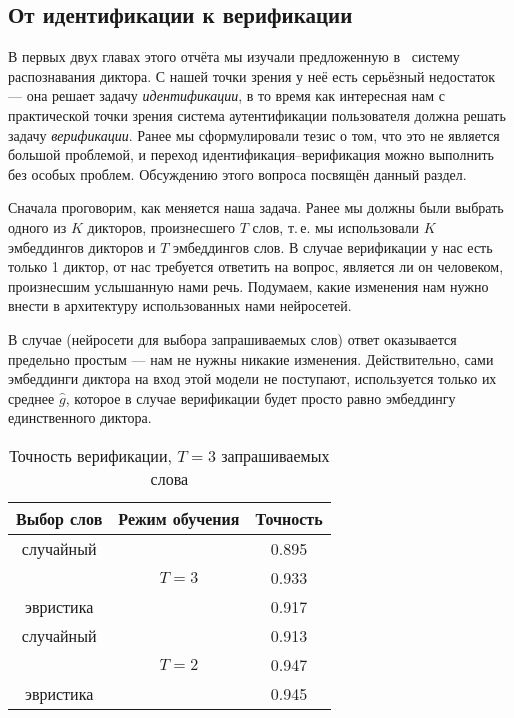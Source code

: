 \subsection{От идентификации к верификации}\label{ssec:verification}

В первых двух главах этого отчёта мы изучали предложенную в~\citeisr{} систему
распознавания диктора. С нашей точки зрения у неё есть серьёзный недостаток ---
она решает задачу \emph{идентификации}, в то время как интересная нам с
практической точки зрения система аутентификации пользователя должна решать
задачу \emph{верификации}. Ранее мы сформулировали тезис о том, что это не
является большой проблемой, и переход идентификация--верификация можно выполнить
без особых проблем. Обсуждению этого вопроса посвящён данный раздел.

Сначала проговорим, как меняется наша задача. Ранее мы должны были выбрать
одного из $K$ дикторов, произнесшего $T$ слов, т.\,е. мы использовали $K$
эмбеддингов дикторов и $T$ эмбеддингов слов. В случае верификации у нас есть
только 1 диктор, от нас требуется ответить на вопрос, является ли он человеком,
произнесшим услышанную нами речь. Подумаем, какие изменения нам нужно внести
в архитектуру использованных нами нейросетей.

В случае \enquirer{} (нейросети для выбора запрашиваемых слов) ответ оказывается
предельно простым --- нам не нужны никакие изменения. Действительно, сами
эмбеддинги диктора на вход этой модели не поступают, используется только их
среднее $\hat{g}$, которое в случае верификации будет просто равно эмбеддингу
единственного диктора.

\begin{table}[htb]
    \centering
    \begin{tabular}{c c c}
        \toprule
        Выбор слов & Режим обучения & Точность\\
        \midrule
        случайный & \multirow{3}{4em}{$T = 3$} & 0.895 \\
        \enquirer{} & & 0.933\\
        эвристика & & 0.917\\
        \midrule
        случайный & \multirow{3}{4em}{$T = 2$} & 0.913 \\
        \enquirer{} & & 0.947\\
        эвристика & & 0.945\\
        \bottomrule
    \end{tabular}
    \caption{Точность верификации, $T = 3$ запрашиваемых слова}
    \label{tab:ver}
\end{table}

